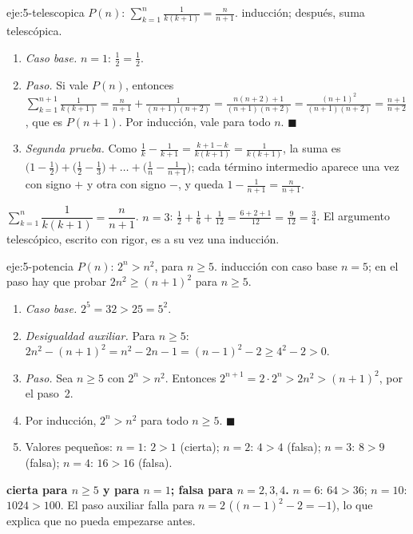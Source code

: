 \begin{solucion}{eje:5-telescopica}
\datos $P(n)$: $\sum_{k=1}^{n}\frac{1}{k(k+1)}=\frac{n}{n+1}$.
\planteamiento inducción; después, suma telescópica.
\pasos
\begin{enumerate}[label=\arabic*.]
  \item \emph{Caso base.} $n=1$: $\frac{1}{2}=\frac{1}{2}$.
  \item \emph{Paso.} Si vale $P(n)$, entonces $\sum_{k=1}^{n+1}\frac{1}{k(k+1)}=\frac{n}{n+1}+\frac{1}{(n+1)(n+2)}=\frac{n(n+2)+1}{(n+1)(n+2)}=\frac{(n+1)^{2}}{(n+1)(n+2)}=\frac{n+1}{n+2}$, que es $P(n+1)$. Por inducción, vale para todo $n$. $\blacksquare$
  \item \emph{Segunda prueba.} Como $\frac1k-\frac1{k+1}=\frac{k+1-k}{k(k+1)}=\frac{1}{k(k+1)}$, la suma es $\bigl(1-\tfrac12\bigr)+\bigl(\tfrac12-\tfrac13\bigr)+\dots+\bigl(\tfrac1n-\tfrac1{n+1}\bigr)$; cada término intermedio aparece una vez con signo $+$ y otra con signo $-$, y queda $1-\frac{1}{n+1}=\frac{n}{n+1}$.
\end{enumerate}
\resultado $\sum_{k=1}^{n}\dfrac{1}{k(k+1)}=\dfrac{n}{n+1}$.
\comprobacion $n=3$: $\frac12+\frac16+\frac1{12}=\frac{6+2+1}{12}=\frac{9}{12}=\frac34$. El argumento telescópico, escrito con rigor, es a su vez una inducción.
\end{solucion}

\begin{solucion}{eje:5-potencia}
\datos $P(n)$: $2^{n}>n^{2}$, para $n\ge 5$.
\planteamiento inducción con caso base $n=5$; en el paso hay que probar $2n^{2}\ge(n+1)^{2}$ para $n\ge 5$.
\pasos
\begin{enumerate}[label=\arabic*.]
  \item \emph{Caso base.} $2^{5}=32>25=5^{2}$.
  \item \emph{Desigualdad auxiliar.} Para $n\ge 5$: $2n^{2}-(n+1)^{2}=n^{2}-2n-1=(n-1)^{2}-2\ge 4^{2}-2>0$.
  \item \emph{Paso.} Sea $n\ge 5$ con $2^{n}>n^{2}$. Entonces $2^{n+1}=2\cdot 2^{n}>2n^{2}>(n+1)^{2}$, por el paso~2.
  \item Por inducción, $2^{n}>n^{2}$ para todo $n\ge 5$. $\blacksquare$
  \item Valores pequeños: $n=1$: $2>1$ (cierta); $n=2$: $4>4$ (falsa); $n=3$: $8>9$ (falsa); $n=4$: $16>16$ (falsa).
\end{enumerate}
\resultado \textbf{cierta para $n\ge 5$ y para $n=1$; falsa para $n=2,3,4$.}
\comprobacion $n=6$: $64>36$; $n=10$: $1024>100$. El paso auxiliar falla para $n=2$ ($(n-1)^{2}-2=-1$), lo que explica que no pueda empezarse antes.
\end{solucion}

